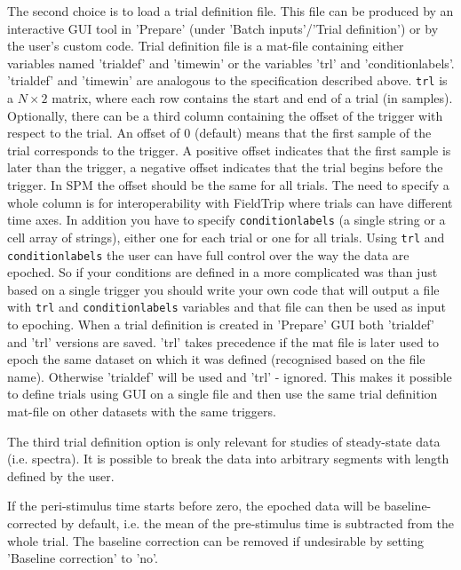 The second choice is to load a trial definition file. This file can be produced by an interactive GUI tool in 'Prepare' (under 'Batch inputs'/'Trial definition') or by the user's custom code.  Trial definition file is a mat-file containing either variables named 'trialdef' and 'timewin' or the variables 'trl' and 'conditionlabels'.  'trialdef' and 'timewin' are analogous to the specification described above. \texttt{trl}  is  a $N \times 2$ matrix, where each row contains the start and end of a trial (in samples). Optionally, there can be a third column containing the offset of the trigger with respect to the trial. An offset of 0 (default) means that the first sample of the trial corresponds to the trigger. A positive offset indicates that the first sample is later than the trigger, a negative offset indicates that the trial begins before the trigger. In SPM the offset should be the same for all trials. The need to specify a whole column is for interoperability with FieldTrip where trials can have different time axes. In addition you have to specify \texttt{conditionlabels} (a single string or a cell array of strings), either one for each trial or one for all trials. Using \texttt{trl} and \texttt{conditionlabels} the user can have full control over the way the data are epoched. So if your conditions are defined in a more complicated was than just based on a single trigger you should write your own code that will output a file with \texttt{trl} and \texttt{conditionlabels} variables and that file can then be used as input to epoching. When a trial definition is created in 'Prepare' GUI both 'trialdef' and 'trl' versions are saved. 'trl' takes precedence if the mat file is later used to epoch the same dataset on which it was defined (recognised based on the file name). Otherwise 'trialdef' will be used and 'trl' - ignored. This makes it possible to define trials using GUI on a single file and then use the same trial definition mat-file on other datasets with the same triggers.

The third trial definition option is only relevant for studies of steady-state data (i.e. spectra). It is possible to break the data into arbitrary segments with length defined by the user. 

If the peri-stimulus time starts before zero, the epoched data will be baseline-corrected by default, i.e. the mean of the pre-stimulus time is subtracted from the whole trial. The baseline correction can be removed if undesirable by setting 'Baseline correction' to 'no'.  

